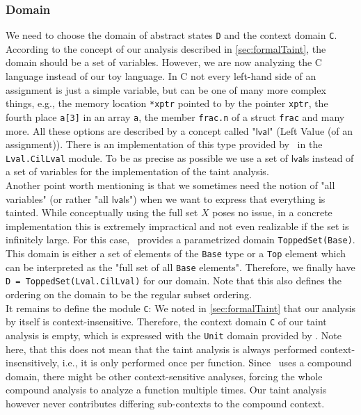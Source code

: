       \subsubsection{Domain}
        We need to choose the domain of abstract states \texttt{D} and the context domain \texttt{C}. According to the concept of our analysis described in \autoref{sec:formalTaint}, the domain should be a set of variables. However, we are now analyzing the C language instead of our toy language. In C not every left-hand side of an assignment is just a simple variable, but can be one of many more complex things, e.g., the memory location \texttt{*xptr} pointed to by the pointer \texttt{xptr}, the fourth place \texttt{a[3]} in an array \texttt{a}, the member \texttt{frac.n} of a struct \texttt{frac} and many more. All these options are described by a concept called "$\textsf{lval}$" (Left Value (of an assignment)). There is an implementation of this type provided by \gob\ in the \texttt{Lval.CilLval} module. To be as precise as possible we use a set of $\textsf{lval}$s instead of a set of variables for the implementation of the taint analysis.\\
        Another point worth mentioning is that we sometimes need the notion of "all variables" (or rather "all $\textsf{lval}$s") when we want to express that everything is tainted. While conceptually using the full set $X$ poses no issue, in a concrete implementation this is extremely impractical and not even realizable if the set is infinitely large. For this case, \gob\ provides a parametrized domain \texttt{ToppedSet(Base)}. This domain is either a set of elements of the \texttt{Base} type or a \texttt{Top} element which can be interpreted as the "full set of all \texttt{Base} elements". Therefore, we finally have \texttt{D = ToppedSet(Lval.CilLval)} for our domain. Note that this also defines the ordering on the domain to be the regular subset ordering.\\
        It remains to define the module \texttt{C}: We noted in \autoref{sec:formalTaint} that our analysis by itself is context-insensitive. Therefore, the context domain \texttt{C} of our taint analysis is empty, which is expressed with the \texttt{Unit} domain provided by \gob. Note here, that this does not mean that the taint analysis is always performed context-insensitively, i.e., it is only performed once per function. Since \gob\ uses a compound domain, there might be other context-sensitive analyses, forcing the whole compound analysis to analyze a function multiple times. Our taint analysis however never contributes differing sub-contexts to the compound context.

